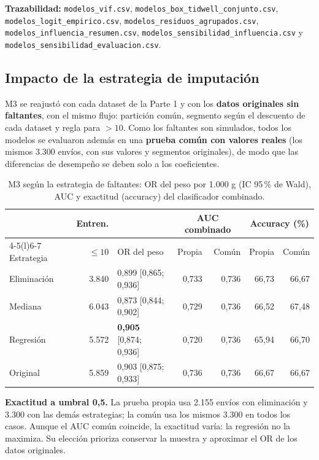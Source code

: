 \documentclass[11pt,a4paper]{article}
\newcommand{\codigo}[1]{{\small\texttt{#1}}}
\begin{document}
{\footnotesize\raggedright\textbf{Trazabilidad:} \codigo{modelos\_vif.csv}, \codigo{modelos\_box\_tidwell\_conjunto.csv}, \codigo{modelos\_logit\_empirico.csv}, \codigo{modelos\_residuos\_agrupados.csv}, \codigo{modelos\_influencia\_resumen.csv}, \codigo{modelos\_sensibilidad\_influencia.csv} y \codigo{modelos\_sensibilidad\_evaluacion.csv}.\par}
\subsection{Impacto de la estrategia de imputación}\label{sec:result-impacto}
M3 se reajustó con cada dataset de la Parte 1 y con los \textbf{datos originales sin faltantes}, con el mismo flujo: partición común, segmento según el descuento de cada dataset y regla para $> 10$. Como los faltantes son simulados, todos los modelos se evaluaron además en una \textbf{prueba común con valores reales} (los mismos 3.300 envíos, con sus valores y segmentos originales), de modo que las diferencias de desempeño se deben solo a los coeficientes.

\begin{table}[!htb]\centering\footnotesize\setlength{\tabcolsep}{4pt}
\caption{M3 según la estrategia de faltantes: OR del peso por 1.000 g (IC 95\,\% de Wald), AUC y exactitud (accuracy) del clasificador combinado.}\label{tab:impacto}
\begin{tabular}{@{}lrlrrrr@{}}\toprule
 & Entren. & & \multicolumn{2}{c}{AUC combinado} & \multicolumn{2}{c}{Accuracy (\%)}\\\cmidrule(lr){4-5}\cmidrule(l){6-7}
Estrategia & $\le 10$ & OR del peso & Propia & Común & Propia & Común\\\midrule
Eliminación & 3.840 & 0,899 [0,865; 0,936] & 0,733 & 0,736 & 66,73 & 66,67\\
Mediana & 6.043 & 0,873 [0,844; 0,902] & 0,729 & 0,736 & 66,52 & 67,48\\
Regresión & 5.572 & \textbf{0,905} [0,874; 0,936] & 0,720 & 0,736 & 65,94 & 66,70\\
Original & 5.859 & 0,903 [0,875; 0,933] & 0,736 & 0,736 & 66,67 & 66,67\\
\bottomrule\end{tabular}
\end{table}

\textbf{Exactitud a umbral 0,5.} La prueba propia usa 2.155 envíos con eliminación y 3.300 con las demás estrategias; la común usa los mismos 3.300 en todos los casos. Aunque el AUC común coincide, la exactitud varía: la regresión no la maximiza. Su elección prioriza conservar la muestra y aproximar el OR de los datos originales.
\end{document}
